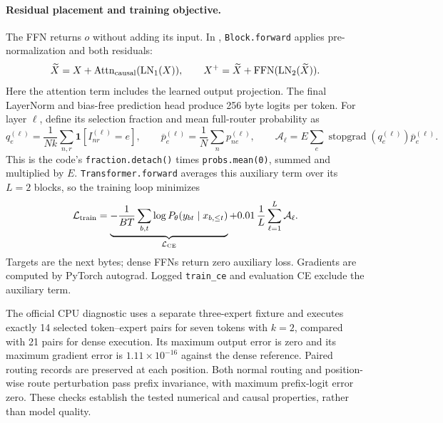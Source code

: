 \paragraph{Residual placement and training objective.}
The FFN returns $o$ without adding its input. In ,
\texttt{Block.forward} applies pre-normalization and both residuals:
\begin{equation}
\widetilde X=X+\operatorname{Attn}_{\rm causal}(\operatorname{LN}_1(X)),
\qquad X^{+}=\widetilde X+\operatorname{FFN}(\operatorname{LN}_2(\widetilde X)).
\end{equation}
Here the attention term includes the learned output projection. The final
LayerNorm and bias-free prediction head produce 256 byte logits per token.
For layer $\ell$, define its selection fraction and mean full-router probability
as
\begin{equation}
q_e^{(\ell)}=\frac{1}{Nk}\sum_{n,r}\mathbf1[I_{nr}^{(\ell)}=e],\qquad
\overline p_e^{(\ell)}=\frac1N\sum_n p_{ne}^{(\ell)},\qquad
\mathcal A_\ell=E\sum_e\operatorname{stopgrad}(q_e^{(\ell)})\overline p_e^{(\ell)}.
\end{equation}
This is the code's \texttt{fraction.detach()} times \texttt{probs.mean(0)},
summed and multiplied by $E$. \texttt{Transformer.forward} averages this
auxiliary term over its $L=2$ blocks, so the training loop minimizes
\begin{equation}
\mathcal L_{\rm train}=
\underbrace{-\frac1{BT}\sum_{b,t}\log P_\theta(y_{bt}\mid x_{b,\le t})}_{\mathcal L_{\rm CE}}
+0.01\,\frac1L\sum_{\ell=1}^{L}\mathcal A_\ell.
\end{equation}
Targets are the next bytes; dense FFNs return zero auxiliary loss. Gradients
are computed by PyTorch autograd. Logged \texttt{train\_ce} and evaluation CE
exclude the auxiliary term.

The official CPU diagnostic uses a separate three-expert fixture and executes exactly 14 selected token--expert pairs for seven tokens with $k=2$, compared with 21 pairs for dense execution. Its maximum output error is zero and its maximum gradient error is $1.11\times10^{-16}$ against the dense reference. Paired routing records are preserved at each position. Both normal routing and position-wise route perturbation pass prefix invariance, with maximum prefix-logit error zero. These checks establish the tested numerical and causal properties, rather than model quality.

